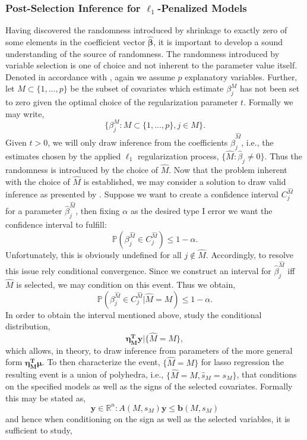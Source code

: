 \documentclass[a4paper,12pt, headsepline]{scrartcl}
\numberwithin{equation}{section}
\begin{document}
\subsubsection{Post-Selection Inference for $\ell_1$-Penalized Models}\label{subsubsec:psi}
Having discovered the randomness introduced by shrinkage to exactly zero of some elements in the coefficient vector $\bm{\hat{\beta}}$, it is important to develop a sound understanding of the source of randomness. The randomness introduced by variable selection is one of choice and not inherent to the parameter value itself. Denoted in accordance with \citet{Lee2016}, again we assume $p$ explanatory variables. Further, let $M\subset\{1, ..., p\}$ be the subset of covariates which estimate $\beta_j^M$ has not been set to zero given the optimal choice of the regularization parameter $t$. Formally we may write,
\[
\{\beta_j^M: M\subset\{1, ..., p\}, j \in M\}.
\]
Given $t > 0$, we will only draw inference from the coefficients $\hat\beta_j^{\hat M}$, i.e., the estimates chosen by the applied $\ell_1$ regularization process, $\{\hat M: \hat\beta_j \neq 0\}$. Thus the randomness is introduced by the choice of $\hat M$. Now that the problem inherent with the choice of $\hat M$ is established, we may consider a solution to draw valid inference as presented by \citet{Lee2016}. Suppose we want to create a confidence interval $C_j^{\hat M}$ for a parameter $\hat\beta_j^{\hat M}$, then fixing $\alpha$ as the desired type I error we want the confidence interval to fulfill:
\[
\mathbb{P}(\beta_j^{\hat M} \in C_j^{\hat M}) \leq 1 - \alpha.
\]
Unfortunately, this is obviously undefined for all $j \notin \hat M$. Accordingly, to resolve this issue \citet{Lee2016} rely conditional convergence. Since we construct an interval for $\hat\beta_j^{\hat M}$ iff $\hat M$ is selected, we may condition on this event. Thus we obtain,
\[
\mathbb{P}(\beta_j^{\hat M} \in C_j^{\hat M}| \hat M = M) \leq 1 - \alpha.
\]
In order to obtain the interval mentioned above, \citet{Lee2016} study the conditional distribution,
\[
\bm{\eta_M^Ty}|\{\hat M = M\},
\]
which allows, in theory, to draw inference from parameters of the more general form $\bm{\eta_M^T\mu}$. To then characterize the event, $\{\hat M = M\}$ for lasso regression the resulting event is a union of polyhedra, i.e., $\{\hat M = M, \hat s_M = s_M\}$, that conditions on the specified models as well as the signs of the selected covariates. Formally this may be stated as,
\[
\bm{y} \in \mathbb{R}^n: A(M, s_M)\bm{y} \leq \bm{b}(M, s_M)
\]
and hence when conditioning on the sign as well as the selected variables, it is sufficient to study,
\end{document}
